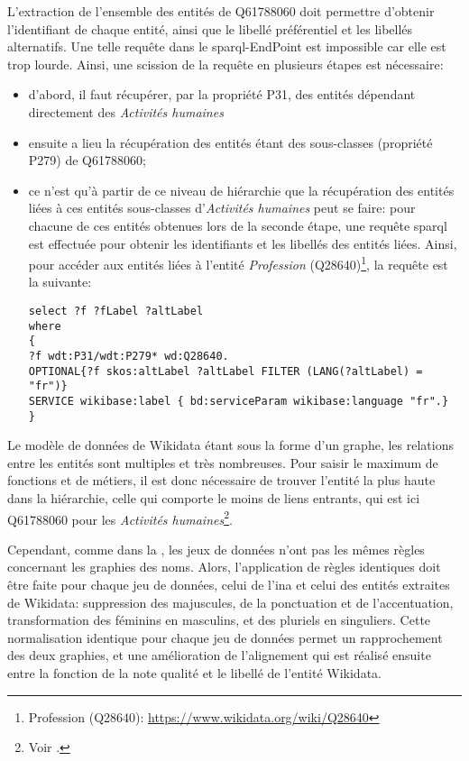 L'extraction de l'ensemble des entités de Q61788060 doit permettre d'obtenir l'identifiant de chaque entité, ainsi que le libellé préférentiel et les libellés alternatifs. Une telle requête dans le \ac{sparql}-EndPoint est impossible car elle est trop lourde. Ainsi, une scission de la requête en plusieurs étapes est nécessaire:
\begin{itemize}
	\item d'abord, il faut récupérer, par la propriété P31, des entités dépendant directement des \textit{Activités humaines}
	\item ensuite a lieu la récupération des entités étant des sous-classes (propriété P279) de Q61788060;
	\item ce n'est qu'à partir de ce niveau de hiérarchie que la récupération des entités liées à ces entités sous-classes d'\textit{Activités humaines} peut se faire: pour chacune de ces entités obtenues lors de la seconde étape, une requête \ac{sparql} est effectuée pour obtenir les identifiants et les libellés des entités liées.
	Ainsi, pour accéder aux entités liées à l'entité \textit{Profession} (Q28640)\footnote{Profession (Q28640): \url{https://www.wikidata.org/wiki/Q28640}}, la requête est la suivante:
	\begin{verbatim}
select ?f ?fLabel ?altLabel
where
{
?f wdt:P31/wdt:P279* wd:Q28640.
OPTIONAL{?f skos:altLabel ?altLabel FILTER (LANG(?altLabel) = "fr")}
SERVICE wikibase:label { bd:serviceParam wikibase:language "fr".}
}
	\end{verbatim}
\end{itemize}
\medskip
Le modèle de données de Wikidata étant sous la forme d'un graphe, les relations entre les entités sont multiples et très nombreuses. Pour saisir le maximum de fonctions et de métiers, il est donc nécessaire de trouver l'entité la plus haute dans la hiérarchie, celle qui comporte le moins de liens entrants, qui est ici Q61788060 pour les \textit{Activités humaines}\footnote{Voir .}.



Cependant, comme dans la , les jeux de données n'ont pas les mêmes règles concernant les graphies des noms. Alors, l'application de règles identiques doit être faite pour chaque jeu de données, celui de l'\ac{ina} et celui des entités extraites de Wikidata: suppression des majuscules, de la ponctuation et de l'accentuation, transformation des féminins en masculins, et des pluriels en singuliers. Cette normalisation identique pour chaque jeu de données permet un rapprochement des deux graphies, et une amélioration de l'alignement qui est réalisé ensuite entre la fonction de la note qualité et le libellé de l'entité Wikidata.

